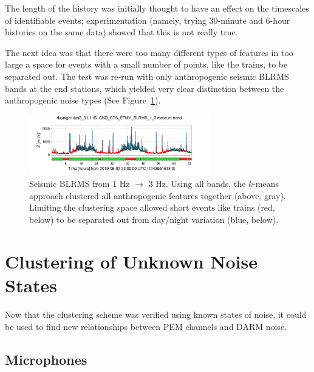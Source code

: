 \documentclass[colorlinks=true,pdfstartview=FitV,linkcolor=blue,
            citecolor=red,urlcolor=magenta]{ligodoc}
\begin{document}
The length of the history was initially thought to have an effect on the timescales of identifiable events; experimentation (namely, trying 30-minute and 6-hour histories on the same data) showed that this is not really true.

The next idea was that there were too many different types of features in too large a space for events with a small number of points, like the trains, to be separated out.
The test was re-run with only anthropogenic seismic BLRMS bands at the end stations, which yielded very clear distinction between the anthropogenic noise types (See Figure~\ref{fig:trains}).

\begin{figure}
  \includegraphics[width=0.7\textwidth]{assets/final/daynight-day2_3-L1:ISI-GND_STS_ETMY_BLRMS_1_3mean,m-trend.png}
  
  \caption{Seismic BLRMS from 1 Hz $\to$ 3 Hz. Using all bands, the $k$-means approach clustered all anthropogenic features together (above, gray). Limiting the clustering space allowed short events like trains (red, below) to be separated out from day/night variation (blue, below).}\label{fig:trains}
\end{figure}

\section{Clustering of Unknown Noise States}\label{sec:unknown}
Now that the clustering scheme was verified using known states of noise, it could be used to find new relationships between PEM channels and DARM noise.

\subsection{Microphones}\label{ssec:mic}
\end{document}
